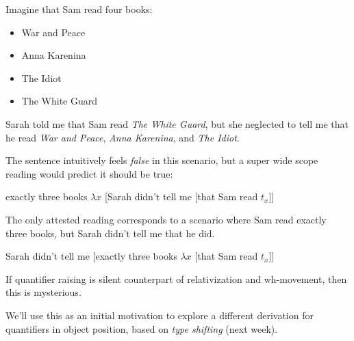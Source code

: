 \documentclass[letterpaper,parskip=half]{scrartcl}
\begin{document}
Imagine that Sam read four books:

\begin{itemize}
\item War and Peace
\item Anna Karenina
\item The Idiot
\item The White Guard
\end{itemize}

Sarah told me that Sam read \emph{The White Guard}, but she neglected to tell me that he read \emph{War and Peace}, \emph{Anna Karenina}, and \emph{The Idiot}.

The sentence intuitively feels \emph{false} in this scenario, but a super wide scope reading would predict it should be true:

\begin{exe}
\ex exactly three books \(\lambda x\) [Sarah didn't tell me [that Sam read \(t_x\)]]
\label{org43b7c74}
\end{exe}

The only attested reading corresponds to a scenario where Sam read exactly three books, but Sarah didn't tell me that he did.

\begin{exe}
\ex Sarah didn't tell me [exactly three books \(\lambda x\) [that Sam read \(t_x\)]]
\label{org03c232e}
\end{exe}

If quantifier raising is silent counterpart of relativization and wh-movement, then this is mysterious.

We'll use this as an initial motivation to explore a different derivation for quantifiers in object position, based on \emph{type shifting} (next week).

\printbibliography
\end{document}
